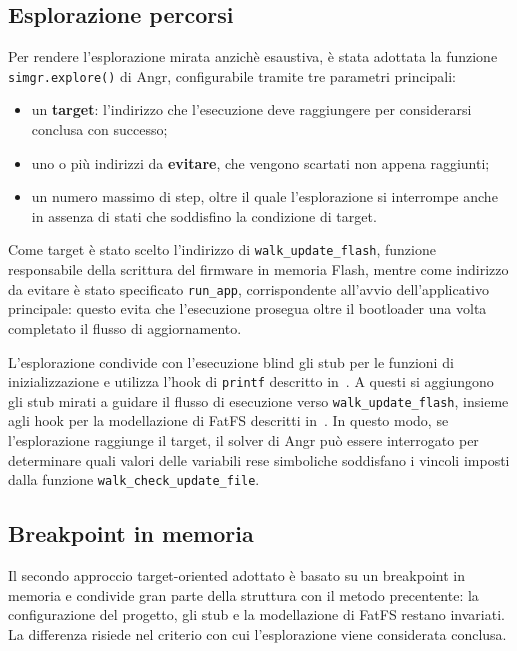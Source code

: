     \subsection{Esplorazione percorsi}
        \label{subsec:esplorazione_percorsi}
        Per rendere l'esplorazione mirata anzichè esaustiva, è stata adottata 
        la funzione \texttt{simgr.explore()} di Angr, configurabile tramite tre 
        parametri principali:

        \begin{itemize}[noitemsep]
            \item un \textbf{target}: l'indirizzo che l'esecuzione deve 
            raggiungere per considerarsi conclusa con successo;
            \item uno o più indirizzi da \textbf{evitare}, che vengono scartati 
            non appena raggiunti;
            \item un numero massimo di step, oltre il quale l'esplorazione si 
            interrompe anche in assenza di stati che soddisfino la condizione 
            di target.
        \end{itemize}
        
        Come target è stato scelto l'indirizzo di \texttt{walk\_update\_flash}, 
        funzione responsabile della scrittura del firmware in memoria Flash, 
        mentre come indirizzo da evitare è stato specificato \texttt{run\_app}, 
        corrispondente all'avvio dell'applicativo principale: questo evita che 
        l'esecuzione prosegua oltre il bootloader una volta completato il flusso 
        di aggiornamento.
        
        L'esplorazione condivide con l'esecuzione blind gli stub per le funzioni 
        di inizializzazione e utilizza l'hook di \texttt{printf} descritto in~. A questi si aggiungono gli stub mirati a guidare il 
        flusso di esecuzione verso \texttt{walk\_update\_flash}, insieme agli 
        hook per la modellazione di FatFS descritti in~. In questo 
        modo, se l'esplorazione raggiunge il target, il solver di Angr può 
        essere interrogato per determinare quali valori delle variabili rese 
        simboliche soddisfano i vincoli imposti dalla funzione 
        \texttt{walk\_check\_update\_file}.

    \subsection{Breakpoint in memoria}
    \label{subsec:breakpoint_memoria}
        Il secondo approccio target-oriented adottato è basato su un breakpoint in memoria e condivide gran parte della struttura con il metodo precentente: la configurazione del progetto, gli stub e la modellazione di FatFS restano invariati. La differenza risiede nel criterio con cui l'esplorazione viene considerata conclusa.

